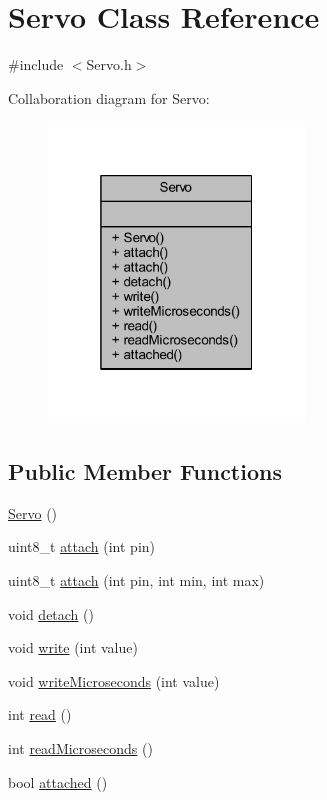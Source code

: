 \hypertarget{class_servo}{}\section{Servo Class Reference}
\label{class_servo}


{\ttfamily \#include $<$Servo.\+h$>$}



Collaboration diagram for Servo\+:
\nopagebreak
\begin{figure}[H]
\begin{center}
\leavevmode
\includegraphics[width=193pt]{d2/d0a/class_servo__coll__graph}
\end{center}
\end{figure}
\subsection*{Public Member Functions}
\begin{DoxyCompactItemize}
\item 
\hyperlink{class_servo_a70b2b17657cf258cdcb57503bcf62cd2}{Servo} ()
\item 
uint8\+\_\+t \hyperlink{class_servo_aeccd2077f07ebc45250da14e72a0c461}{attach} (int pin)
\item 
uint8\+\_\+t \hyperlink{class_servo_a70076d9a77de97241badd1f377817219}{attach} (int pin, int min, int max)
\item 
void \hyperlink{class_servo_a0b69ccc5c8b348ebaa84be91d973a362}{detach} ()
\item 
void \hyperlink{class_servo_a72b4b546912eada96a6ef705168ceb8a}{write} (int value)
\item 
void \hyperlink{class_servo_ac7fe3d6d2ea285ead98814bcfc417029}{write\+Microseconds} (int value)
\item 
int \hyperlink{class_servo_aaca0af33ba7d7c87c8a785b8eabf95a7}{read} ()
\item 
int \hyperlink{class_servo_a43950424d146c1414460066483d9561b}{read\+Microseconds} ()
\item 
bool \hyperlink{class_servo_a48607d47aa5678780b1b927102bd3b1b}{attached} ()
\end{DoxyCompactItemize}


